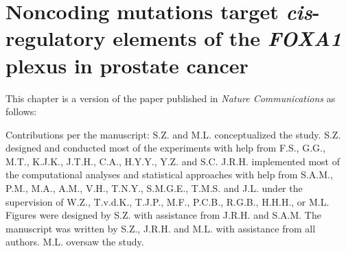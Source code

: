 \chapter{Noncoding mutations target \emph{cis}-regulatory elements of the \emph{FOXA1} plexus in prostate cancer}
\label{chap:FOXA1}

This chapter is a version of the paper published in \emph{Nature Communications} as follows:


\vspace{1em}

Contributions per the manuscript:
S.Z. and M.L. conceptualized the study.
S.Z. designed and conducted most of the experiments with help from F.S., G.G., M.T., K.J.K., J.T.H., C.A., H.Y.Y., Y.Z. and S.C.
J.R.H. implemented most of the computational analyses and statistical approaches with
help from S.A.M., P.M., M.A., A.M., V.H., T.N.Y., S.M.G.E., T.M.S. and J.L. under the
supervision of W.Z., T.v.d.K., T.J.P., M.F., P.C.B., R.G.B., H.H.H., or M.L.
Figures were designed by S.Z. with assistance from J.R.H. and S.A.M.
The manuscript was written by S.Z., J.R.H. and M.L. with assistance from all authors.
M.L. oversaw the study.








